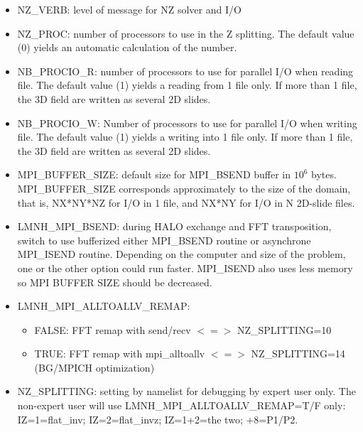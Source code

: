 \begin{itemize} 
\item NZ\_VERB: level of message for NZ solver and I/O  
              
\item NZ\_PROC: number of processors to use in the Z splitting. The default value (0) yields an automatic calculation of the number.
             
\item NB\_PROCIO\_R: number of processors to use for parallel I/O when reading file. The default value (1) yields a reading from 1 file only. If more than 1 file, the 3D field are written as several 2D slides.

\item NB\_PROCIO\_W: Number of processors to use for parallel I/O when writing file. The default value (1) yields a writing into 1 file only. If more than 1 file, the 3D field are written as several 2D slides.
              
\item MPI\_BUFFER\_SIZE: default size for MPI\_BSEND buffer in $10^6$ bytes. MPI\_BUFFER\_SIZE corresponds approximately to the size of the domain, that is, NX*NY*NZ for I/O in 1 file, and NX*NY for I/O in N 2D-slide files.

\item LMNH\_MPI\_BSEND:
during HALO exchange and FFT transposition, switch to use bufferized either MPI\_BSEND routine or asynchrone MPI\_ISEND routine. Depending on the computer and size of the problem, one or the other option could run faster. MPI\_ISEND also uses less memory so MPI BUFFER SIZE should be decreased. 

\item LMNH\_MPI\_ALLTOALLV\_REMAP: 
\begin{itemize} 
\item FALSE: FFT remap with send/recv $<=>$ NZ\_SPLITTING=10
\item TRUE: FFT remap with mpi\_alltoallv $<=>$ NZ\_SPLITTING=14 (BG/MPICH optimization) 
\end{itemize}

\item NZ\_SPLITTING: setting by namelist for debugging by expert user only. 
The non-expert user will use LMNH\_MPI\_ALLTOALLV\_REMAP=T/F only:
IZ=1=flat\_inv; IZ=2=flat\_invz; IZ=1+2=the two; +8=P1/P2.

\end{itemize}


